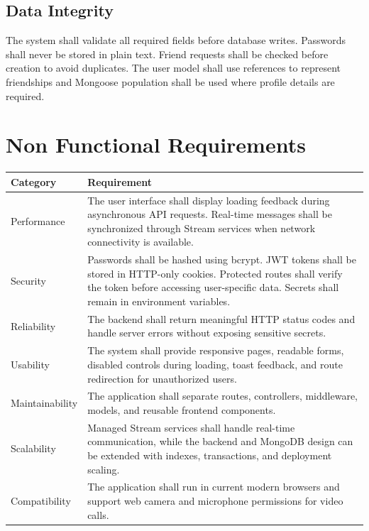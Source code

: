 \documentclass[12pt,a4paper]{report}
\begin{document}
\section{Data Integrity}
The system shall validate all required fields before database writes. Passwords shall never be stored in plain text. Friend requests shall be checked before creation to avoid duplicates. The user model shall use references to represent friendships and Mongoose population shall be used where profile details are required.

\chapter{Non Functional Requirements}
\begin{longtable}{|p{1.5in}|p{4.6in}|}
\hline
\rowcolor{gray!25}\textbf{Category} & \textbf{Requirement} \\ \hline
Performance & The user interface shall display loading feedback during asynchronous API requests. Real-time messages shall be synchronized through Stream services when network connectivity is available. \\ \hline
Security & Passwords shall be hashed using bcrypt. JWT tokens shall be stored in HTTP-only cookies. Protected routes shall verify the token before accessing user-specific data. Secrets shall remain in environment variables. \\ \hline
Reliability & The backend shall return meaningful HTTP status codes and handle server errors without exposing sensitive secrets. \\ \hline
Usability & The system shall provide responsive pages, readable forms, disabled controls during loading, toast feedback, and route redirection for unauthorized users. \\ \hline
Maintainability & The application shall separate routes, controllers, middleware, models, and reusable frontend components. \\ \hline
Scalability & Managed Stream services shall handle real-time communication, while the backend and MongoDB design can be extended with indexes, transactions, and deployment scaling. \\ \hline
Compatibility & The application shall run in current modern browsers and support web camera and microphone permissions for video calls. \\ \hline
\end{longtable}
\end{document}
